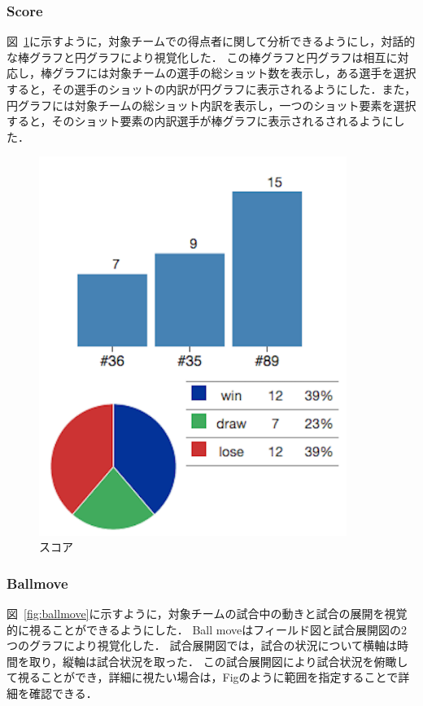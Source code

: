 \documentclass[sotsuron]{kuee}
\begin{document}
			\subsubsection{Score}
				図~\ref{fig:score}に示すように，対象チームでの得点者に関して分析できるようにし，対話的な棒グラフと円グラフにより視覚化した．
				この棒グラフと円グラフは相互に対応し，棒グラフには対象チームの選手の総ショット数を表示し，ある選手を選択すると，その選手のショットの内訳が円グラフに表示されるようにした．また，円グラフには対象チームの総ショット内訳を表示し，一つのショット要素を選択すると，そのショット要素の内訳選手が棒グラフに表示されるされるようにした．
					\begin{figure}
						\begin{center}
							\includegraphics[width=10cm]{./png/score.png}
						\end{center}
						\caption{スコア}
				  		\label{fig:score}
					\end{figure}
			\subsubsection{Ballmove}
				図~\ref{fig:ballmove}に示すように，対象チームの試合中の動きと試合の展開を視覚的に視ることができるようにした．
				Ball moveはフィールド図と試合展開図の2つのグラフにより視覚化した．
				試合展開図では，試合の状況について横軸は時間を取り，縦軸は試合状況を取った．
				この試合展開図により試合状況を俯瞰して視ることができ，詳細に視たい場合は，Figのように範囲を指定することで詳細を確認できる．
\end{document}
